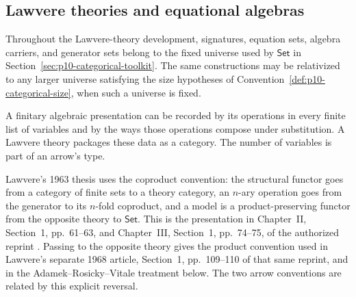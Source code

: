
\subsection{Lawvere theories and equational algebras}
\label{sec:p10-lawvere-theories}

Throughout the Lawvere-theory development, signatures, equation sets,
algebra carriers, and generator sets belong to the fixed universe
used by \(\mathsf{Set}\) in Section~\ref{sec:p10-categorical-toolkit}.
The same constructions may be relativized to any larger universe
satisfying the size hypotheses of
Convention~\ref{def:p10-categorical-size}, when such a universe is fixed.

A finitary algebraic presentation can be recorded by its operations
in every finite list of variables and by the ways those operations
compose under substitution.  A Lawvere theory packages these data
as a category.  The number of variables is part of an arrow's type.

Lawvere's 1963 thesis uses the coproduct convention: the structural
functor goes from a category of finite sets to a theory category,
an \(n\)-ary operation goes from the generator to its \(n\)-fold
coproduct, and a model is a product-preserving functor from the
opposite theory to \(\mathsf{Set}\).
This is the presentation in Chapter~II, Section~1, pp.~61--63,
and Chapter~III, Section~1, pp.~74--75, of the authorized reprint
\cite{Lawvere2004FunctorialReprint}.
Passing to the opposite theory gives the product convention used
in Lawvere's separate 1968 article, Section~1, pp.~109--110 of that
same reprint, and in the Adamek--Rosicky--Vitale treatment below.
The two arrow conventions are related by this explicit reversal.


